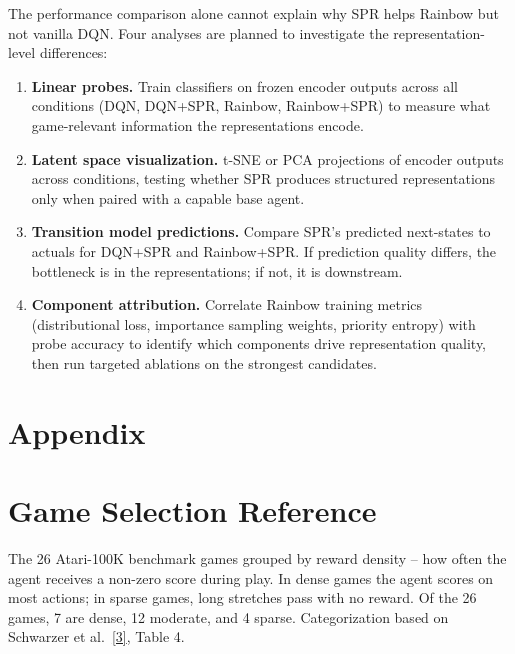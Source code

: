 \documentclass[11pt]{article}
\newcommand{\citelink}[2]{\href{#1}{\small[#2]}}
\begin{document}
The performance comparison alone cannot explain why SPR helps Rainbow
but not vanilla DQN. Four analyses are planned to investigate the
representation-level differences:

\medskip
\begin{enumerate}[leftmargin=*, itemsep=0.6em]
  \item \textbf{Linear probes.} Train classifiers on frozen encoder
    outputs across all conditions (DQN, DQN+SPR, Rainbow, Rainbow+SPR)
    to measure what game-relevant information the representations
    encode.
  \item \textbf{Latent space visualization.} t-SNE or PCA projections
    of encoder outputs across conditions, testing whether SPR produces
    structured representations only when paired with a capable base
    agent.
  \item \textbf{Transition model predictions.} Compare SPR's predicted
    next-states to actuals for DQN+SPR and Rainbow+SPR. If prediction
    quality differs, the bottleneck is in the representations; if
    not, it is downstream.
  \item \textbf{Component attribution.} Correlate Rainbow training
    metrics (distributional loss, importance sampling weights,
    priority entropy) with probe accuracy to identify which
    components drive representation quality, then run targeted
    ablations on the strongest candidates.
\end{enumerate}

\clearpage

\appendix
\section*{Appendix}

\section{Game Selection Reference}
\label{app:games}

The 26 Atari-100K benchmark games grouped by reward density -- how
often the agent receives a non-zero score during play. In dense games
the agent scores on most actions; in sparse games, long stretches pass
with no reward. Of the 26 games, 7 are dense, 12 moderate, and
4 sparse. Categorization based on Schwarzer et al.\
\citelink{https://arxiv.org/abs/2007.05929}{3}, Table 4.
\end{document}
